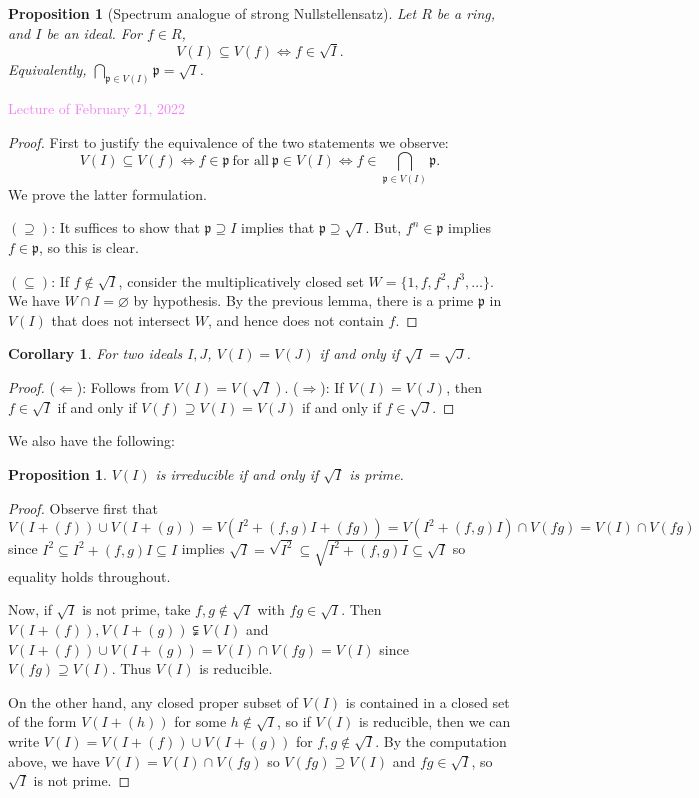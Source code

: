 \documentclass{amsart}[12pt]
\newcommand{\Feb}[1]{\textcolor{violet}{Lecture of February #1, 2022}}
\newcommand{\p}{{\mathfrak p}}
\numberwithin{equation}{section}
\theoremstyle{plain} %
\newtheorem{cor}[equation]{Corollary}
\newtheorem{prop}[equation]{Proposition}
\newtheorem{proposition}[equation]{Proposition}
\theoremstyle{definition}
\theoremstyle{remark}
\begin{document}
\begin{proposition}[Spectrum analogue of strong Nullstellensatz]
	Let $R$ be a ring, and $I$ be an ideal. For $f\in R$,
	\[  V(I) \subseteq V(f) \Longleftrightarrow f\in \sqrt{I}.\] 
	Equivalently, $\bigcap_{\p \in V(I)} \p = \sqrt{I}$.
\end{proposition}

\Feb{21}

\begin{proof}
First to justify the equivalence of the two statements we observe: 
\[V(I) \subseteq V(f) \Leftrightarrow f\in \p \ \text{for all} \ \p\in V(I)  \Leftrightarrow f \in \bigcap_{\p \in V(I)} \p.\]
We prove the latter formulation.

$(\supseteq)$: It suffices to show that $\p \supseteq I$ implies that $\p \supseteq \sqrt{I}$. But, $f^n\in \p$ implies $f\in \p$, so this is clear.

$(\subseteq)$: If $f\notin \sqrt{I}$, consider the multiplicatively closed set $W=\{1,f,f^2,f^3,\dots\}$. We have $W\cap I=\varnothing$ by hypothesis. By the previous lemma, there is a prime $\p$ in $V(I)$ that does not intersect $W$, and hence does not contain $f$.
\end{proof}

\begin{cor} 	For two ideals $I,J$, $V(I)=V(J)$ if and only if $\sqrt{I}=\sqrt{J}$.
\end{cor}
\begin{proof} ($\Leftarrow$): Follows from $V(I)=V(\sqrt{I})$.
($\Rightarrow$): If $V(I)=V(J)$, then $f\in \sqrt{I}$ if and only if $V(f)\supseteq V(I) = V(J)$ if and only if $f\in \sqrt{J}$.
\end{proof}

We also have the following:

\begin{prop} $V(I)$ is irreducible if and only if $\sqrt{I}$ is prime.
\end{prop}
\begin{proof} Observe first that
\[ V(I+(f)) \cup V(I + (g)) = V(I^2 + (f,g)I + (fg)) = V(I^2+(f,g)I) \cap V(fg) = V(I) \cap V(fg)\]
since $I^2 \subseteq I^2+(f,g)I \subseteq I$ implies $\sqrt{I} = \sqrt{I^2} \subseteq \sqrt{I^2+(f,g)I} \subseteq \sqrt{I}$ so equality holds throughout.

Now, if $\sqrt{I}$ is not prime, take $f, g\notin\sqrt{I}$ with $fg\in \sqrt{I}$. Then $V(I+(f)), V(I+(g)) \subsetneqq V(I)$ and $V(I+(f)) \cup V(I + (g)) = V(I) \cap V(fg) = V(I)$ since $V(fg)\supseteq V(I)$. Thus $V(I)$ is reducible.

On the other hand, any closed proper subset of $V(I)$ is contained in a closed set of the form $V(I+(h))$ for some $h\notin \sqrt{I}$, so if $V(I)$ is reducible, then we can write $V(I)= V(I+(f)) \cup V(I + (g))$ for $f,g\notin\sqrt{I}$. By the computation above, we have $V(I)=V(I)\cap V(fg)$ so $V(fg) \supseteq V(I)$ and $fg\in \sqrt{I}$, so $\sqrt{I}$ is not prime.
\end{proof}
\end{document}
